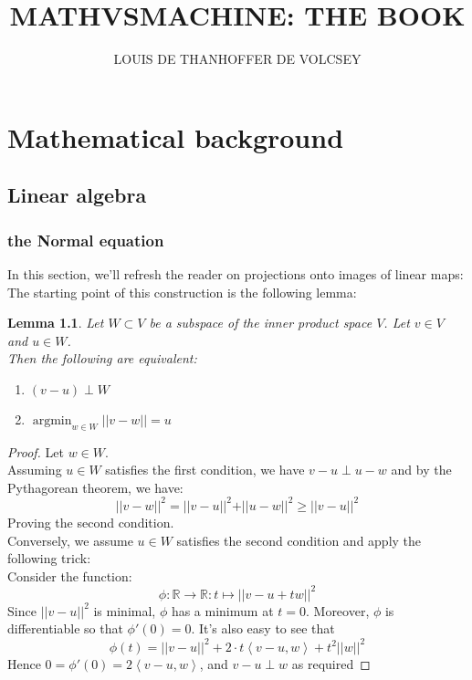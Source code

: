 \documentclass{book}
\theoremstyle{plain}
\newtheorem{lemma}[corollary]{Lemma}
\theoremstyle{definition}
\DeclareMathOperator{\argmin}{argmin}
\newcommand{\bl}[2]{\left\langle #1,#2\right\rangle}
\renewcommand{\d}[1]{\mathbb{#1}}
\newcommand{\fun}{\mapsto}
\newcommand{\norm}[1]{\vert \vert #1 \vert \vert}
\newcommand{\mor}{\longrightarrow}
\begin{document}
\title{\textbf{MATHVSMACHINE: THE BOOK}}
\author{LOUIS DE THANHOFFER DE VOLCSEY}
\date{}
\maketitle	


\noindent\hrulefill
\tableofcontents{}
\noindent\hrulefill

\part{Mathematical background}

\chapter{Linear algebra}
\section{the Normal equation}


\noindent In this section, we'll refresh the reader on projections onto images of linear maps: The starting point of this construction is the following lemma:
\begin{lemma}\label{lem:mindist-perp}
	Let $W\subset V$ be a subspace of the inner product space $V$. Let $v \in V$ and $u \in W$.\\
	Then the  following are equivalent:
	\begin{enumerate}
		\item $(v-u) \perp W$
		\item $	\argmin_{w \in W}\norm{v-w} =u$	
	\end{enumerate}
\end{lemma}

\begin{proof}
	Let $w \in W$.\\
	Assuming $u \in W$ satisfies the first condition, we have $v-u \perp u-w$ and by the Pythagorean theorem, we have:
	\[
	\norm{v-w}^2 = \norm{v-u}^2+\norm{u-w}^2 \ge \norm{v-u}^2
	\]
	Proving the second condition.\\ 
	Conversely, we assume $u\in W$ satisfies the second condition and apply the following trick:\\
	Consider the function:
	\[
	\phi:\d{R}\mor \d{R}: t \fun \norm{v-u+tw}^2
	\]	
	Since $\norm{v-u}^2$ is minimal, $\phi$ has a minimum at $t=0$. Moreover, $\phi$ is differentiable so that $\phi'(0)=0$. It's also easy to see that
	\[
	\phi(t) = \norm{v-u}^2 +2\cdot t \bl{v-u}{w}+t^2\norm{w}^2
	\]
	Hence $0=\phi'(0) = 2 \bl{v-u}{w}$, and $v-u\perp w$ as required
\end{proof}
\end{document}
